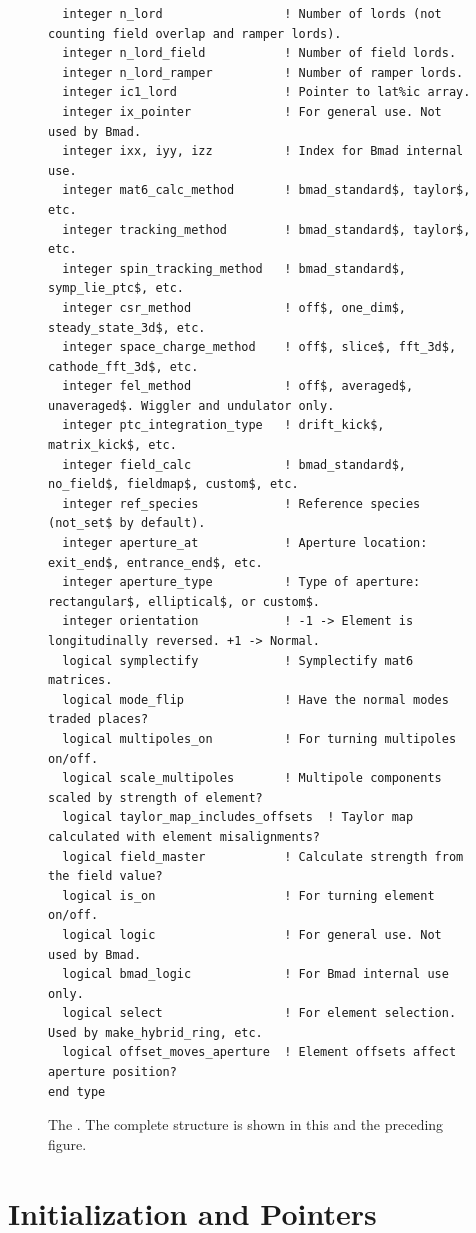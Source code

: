 \begin{figure}[tb]
\begin{verbatim}
  integer n_lord                 ! Number of lords (not counting field overlap and ramper lords).
  integer n_lord_field           ! Number of field lords.
  integer n_lord_ramper          ! Number of ramper lords.
  integer ic1_lord               ! Pointer to lat%ic array.
  integer ix_pointer             ! For general use. Not used by Bmad.
  integer ixx, iyy, izz          ! Index for Bmad internal use.
  integer mat6_calc_method       ! bmad_standard$, taylor$, etc.
  integer tracking_method        ! bmad_standard$, taylor$, etc.
  integer spin_tracking_method   ! bmad_standard$, symp_lie_ptc$, etc.
  integer csr_method             ! off$, one_dim$, steady_state_3d$, etc.
  integer space_charge_method    ! off$, slice$, fft_3d$, cathode_fft_3d$, etc.
  integer fel_method             ! off$, averaged$, unaveraged$. Wiggler and undulator only.
  integer ptc_integration_type   ! drift_kick$, matrix_kick$, etc.
  integer field_calc             ! bmad_standard$, no_field$, fieldmap$, custom$, etc.
  integer ref_species            ! Reference species (not_set$ by default).
  integer aperture_at            ! Aperture location: exit_end$, entrance_end$, etc.
  integer aperture_type          ! Type of aperture: rectangular$, elliptical$, or custom$.
  integer orientation            ! -1 -> Element is longitudinally reversed. +1 -> Normal.
  logical symplectify            ! Symplectify mat6 matrices.
  logical mode_flip              ! Have the normal modes traded places?
  logical multipoles_on          ! For turning multipoles on/off.
  logical scale_multipoles       ! Multipole components scaled by strength of element?
  logical taylor_map_includes_offsets  ! Taylor map calculated with element misalignments?
  logical field_master           ! Calculate strength from the field value?
  logical is_on                  ! For turning element on/off.
  logical logic                  ! For general use. Not used by Bmad.
  logical bmad_logic             ! For Bmad internal use only.
  logical select                 ! For element selection. Used by make_hybrid_ring, etc.
  logical offset_moves_aperture  ! Element offsets affect aperture position?
end type
\end{verbatim}
\caption[The  (part 2).]{The . 
The complete structure is shown in this and the preceding figure.}
\label{f:ele.struct2}
\end{figure}

\section{Initialization and Pointers}

